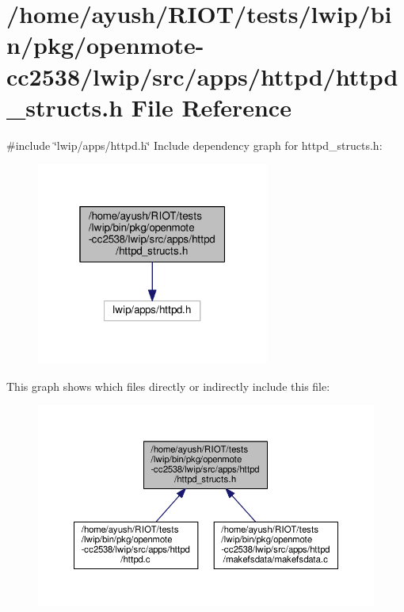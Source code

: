 \hypertarget{openmote-cc2538_2lwip_2src_2apps_2httpd_2httpd__structs_8h}{}\section{/home/ayush/\+R\+I\+O\+T/tests/lwip/bin/pkg/openmote-\/cc2538/lwip/src/apps/httpd/httpd\+\_\+structs.h File Reference}
\label{openmote-cc2538_2lwip_2src_2apps_2httpd_2httpd__structs_8h}
{\ttfamily \#include \char`\"{}lwip/apps/httpd.\+h\char`\"{}}\newline
Include dependency graph for httpd\+\_\+structs.\+h\+:
\nopagebreak
\begin{figure}[H]
\begin{center}
\leavevmode
\includegraphics[width=217pt]{openmote-cc2538_2lwip_2src_2apps_2httpd_2httpd__structs_8h__incl}
\end{center}
\end{figure}
This graph shows which files directly or indirectly include this file\+:
\nopagebreak
\begin{figure}[H]
\begin{center}
\leavevmode
\includegraphics[width=350pt]{openmote-cc2538_2lwip_2src_2apps_2httpd_2httpd__structs_8h__dep__incl}
\end{center}
\end{figure}
